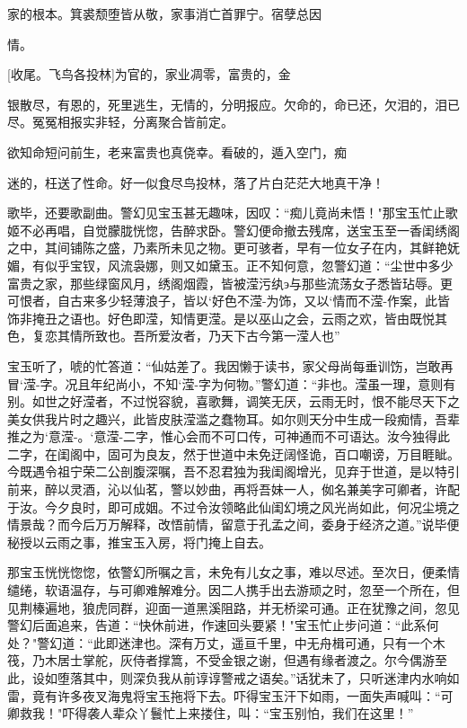 家的根本。箕裘颓堕皆从敬，家事消亡首罪宁。宿孽总因

情。

[收尾。飞鸟各投林]为官的，家业凋零，富贵的，金

银散尽，有恩的，死里逃生，无情的，分明报应。欠命的，命已还，欠泪的，泪已尽。冤冤相报实非轻，分离聚合皆前定。

欲知命短问前生，老来富贵也真侥幸。看破的，遁入空门，痴

迷的，枉送了性命。好一似食尽鸟投林，落了片白茫茫大地真干净！

歌毕，还要歌副曲。警幻见宝玉甚无趣味，因叹：“痴儿竟尚未悟！"那宝玉忙止歌姬不必再唱，自觉朦胧恍惚，告醉求卧。警幻便命撤去残席，送宝玉至一香闺绣阁之中，其间铺陈之盛，乃素所未见之物。更可骇者，早有一位女子在内，其鲜艳妩媚，有似乎宝钗，风流袅娜，则又如黛玉。正不知何意，忽警幻道：“尘世中多少富贵之家，那些绿窗风月，绣阁烟霞，皆被滢污纨э与那些流荡女子悉皆玷辱。更可恨者，自古来多少轻薄浪子，皆以`好色不滢-为饰，又以`情而不滢-作案，此皆饰非掩丑之语也。好色即滢，知情更滢。是以巫山之会，云雨之欢，皆由既悦其色，复恋其情所致也。吾所爱汝者，乃天下古今第一滢人也”

宝玉听了，唬的忙答道：“仙姑差了。我因懒于读书，家父母尚每垂训饬，岂敢再冒`滢-字。况且年纪尚小，不知`滢-字为何物。”警幻道：“非也。滢虽一理，意则有别。如世之好滢者，不过悦容貌，喜歌舞，调笑无厌，云雨无时，恨不能尽天下之美女供我片时之趣兴，此皆皮肤滢滥之蠢物耳。如尔则天分中生成一段痴情，吾辈推之为`意滢-。`意滢-二字，惟心会而不可口传，可神通而不可语达。汝今独得此二字，在闺阁中，固可为良友，然于世道中未免迂阔怪诡，百口嘲谤，万目睚眦。今既遇令祖宁荣二公剖腹深嘱，吾不忍君独为我闺阁增光，见弃于世道，是以特引前来，醉以灵酒，沁以仙茗，警以妙曲，再将吾妹一人，侞名兼美字可卿者，许配于汝。今夕良时，即可成姻。不过令汝领略此仙闺幻境之风光尚如此，何况尘境之情景哉？而今后万万解释，改悟前情，留意于孔孟之间，委身于经济之道。”说毕便秘授以云雨之事，推宝玉入房，将门掩上自去。

那宝玉恍恍惚惚，依警幻所嘱之言，未免有儿女之事，难以尽述。至次日，便柔情缱绻，软语温存，与可卿难解难分。因二人携手出去游顽之时，忽至一个所在，但见荆榛遍地，狼虎同群，迎面一道黑溪阻路，并无桥梁可通。正在犹豫之间，忽见警幻后面追来，告道：“快休前进，作速回头要紧！"宝玉忙止步问道：“此系何处？"警幻道：“此即迷津也。深有万丈，遥亘千里，中无舟楫可通，只有一个木筏，乃木居士掌舵，灰侍者撑篙，不受金银之谢，但遇有缘者渡之。尔今偶游至此，设如堕落其中，则深负我从前谆谆警戒之语矣。”话犹未了，只听迷津内水响如雷，竟有许多夜叉海鬼将宝玉拖将下去。吓得宝玉汗下如雨，一面失声喊叫：“可卿救我！"吓得袭人辈众丫鬟忙上来搂住，叫：“宝玉别怕，我们在这里！”

